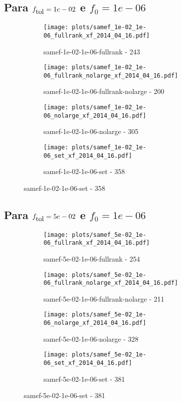 \newpage
\subsection{Para $f_{\mbox{tol}} = 1e-02$ e $f_0 = 1e-06$}

\begin{figure}[H]
  \centering
  \begin{subfigure}{0.48\textwidth}
    \texttt{[image: plots/samef\_1e-02\_1e-06\_fullrank\_xf\_2014\_04\_16.pdf]}
    \caption{samef-1e-02-1e-06-fullrank - 243}
  \end{subfigure}
  \begin{subfigure}{0.48\textwidth}
    \texttt{[image: plots/samef\_1e-02\_1e-06\_fullrank\_nolarge\_xf\_2014\_04\_16.pdf]}
    \caption{samef-1e-02-1e-06-fullrank-nolarge - 200}
  \end{subfigure}
  \begin{subfigure}{0.48\textwidth}
    \texttt{[image: plots/samef\_1e-02\_1e-06\_nolarge\_xf\_2014\_04\_16.pdf]}
    \caption{samef-1e-02-1e-06-nolarge - 305}
  \end{subfigure}
  \begin{subfigure}{0.48\textwidth}
    \texttt{[image: plots/samef\_1e-02\_1e-06\_set\_xf\_2014\_04\_16.pdf]}
    \caption{samef-1e-02-1e-06-set - 358}
  \end{subfigure}
\end{figure}

\newpage
\subsection{Para $f_{\mbox{tol}} = 5e-02$ e $f_0 = 1e-06$}

\begin{figure}[H]
  \centering
  \begin{subfigure}{0.48\textwidth}
    \texttt{[image: plots/samef\_5e-02\_1e-06\_fullrank\_xf\_2014\_04\_16.pdf]}
    \caption{samef-5e-02-1e-06-fullrank - 254}
  \end{subfigure}
  \begin{subfigure}{0.48\textwidth}
    \texttt{[image: plots/samef\_5e-02\_1e-06\_fullrank\_nolarge\_xf\_2014\_04\_16.pdf]}
    \caption{samef-5e-02-1e-06-fullrank-nolarge - 211}
  \end{subfigure}
  \begin{subfigure}{0.48\textwidth}
    \texttt{[image: plots/samef\_5e-02\_1e-06\_nolarge\_xf\_2014\_04\_16.pdf]}
    \caption{samef-5e-02-1e-06-nolarge - 328}
  \end{subfigure}
  \begin{subfigure}{0.48\textwidth}
    \texttt{[image: plots/samef\_5e-02\_1e-06\_set\_xf\_2014\_04\_16.pdf]}
    \caption{samef-5e-02-1e-06-set - 381}
  \end{subfigure}
\end{figure}

